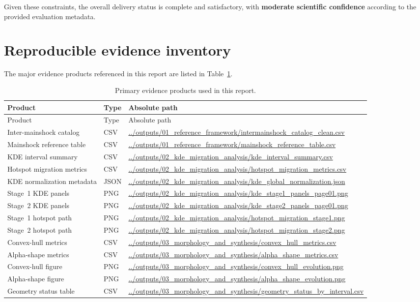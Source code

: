 \documentclass[11pt]{article}
\begin{document}
Given these constraints, the overall delivery status is complete and satisfactory, with \textbf{moderate scientific confidence} according to the provided evaluation metadata.

\section{Reproducible evidence inventory}
The major evidence products referenced in this report are listed in Table~\ref{tab:evidence}.

\begin{longtable}{>{\raggedright\arraybackslash}p{3.3cm} >{\raggedright\arraybackslash}p{2.5cm} >{\raggedright\arraybackslash}p{8.2cm}}
\caption{Primary evidence products used in this report.}\label{tab:evidence}\\
\toprule
Product & Type & Absolute path \\
\midrule
\endfirsthead
\toprule
Product & Type & Absolute path \\
\midrule
\endhead
Inter-mainshock catalog & CSV & \url{../outputs/01_reference_framework/intermainshock_catalog_clean.csv} \\
Mainshock reference table & CSV & \url{../outputs/01_reference_framework/mainshock_reference_table.csv} \\
KDE interval summary & CSV & \url{../outputs/02_kde_migration_analysis/kde_interval_summary.csv} \\
Hotspot migration metrics & CSV & \url{../outputs/02_kde_migration_analysis/hotspot_migration_metrics.csv} \\
KDE normalization metadata & JSON & \url{../outputs/02_kde_migration_analysis/kde_global_normalization.json} \\
Stage~1 KDE panels & PNG & \url{../outputs/02_kde_migration_analysis/kde_stage1_panels_page01.png} \\
Stage~2 KDE panels & PNG & \url{../outputs/02_kde_migration_analysis/kde_stage2_panels_page01.png} \\
Stage~1 hotspot path & PNG & \url{../outputs/02_kde_migration_analysis/hotspot_migration_stage1.png} \\
Stage~2 hotspot path & PNG & \url{../outputs/02_kde_migration_analysis/hotspot_migration_stage2.png} \\
Convex-hull metrics & CSV & \url{../outputs/03_morphology_and_synthesis/convex_hull_metrics.csv} \\
Alpha-shape metrics & CSV & \url{../outputs/03_morphology_and_synthesis/alpha_shape_metrics.csv} \\
Convex-hull figure & PNG & \url{../outputs/03_morphology_and_synthesis/convex_hull_evolution.png} \\
Alpha-shape figure & PNG & \url{../outputs/03_morphology_and_synthesis/alpha_shape_evolution.png} \\
Geometry status table & CSV & \url{../outputs/03_morphology_and_synthesis/geometry_status_by_interval.csv} \\
\bottomrule
\end{longtable}
\end{document}

